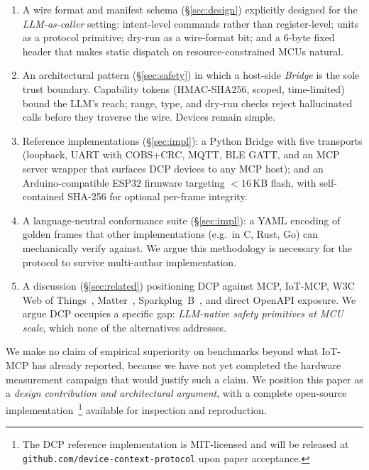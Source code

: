 \documentclass[11pt,a4paper]{article}
\begin{document}
\begin{enumerate}[leftmargin=*,nosep]
  \item A wire format and manifest schema (\S\ref{sec:design}) explicitly
        designed for the \emph{LLM-as-caller} setting: intent-level commands
        rather than register-level; units as a protocol primitive; dry-run as
        a wire-format bit; and a 6-byte fixed header that makes static
        dispatch on resource-constrained MCUs natural.
  \item An architectural pattern (\S\ref{sec:safety}) in which a host-side
        \emph{Bridge} is the sole trust boundary. Capability tokens
        (HMAC-SHA256, scoped, time-limited) bound the LLM's reach; range,
        type, and dry-run checks reject hallucinated calls before they
        traverse the wire. Devices remain simple.
  \item Reference implementations (\S\ref{sec:impl}): a Python Bridge with
        five transports (loopback, UART with COBS+CRC, MQTT, BLE GATT, and
        an MCP server wrapper that surfaces DCP devices to any MCP host);
        and an Arduino-compatible ESP32 firmware targeting $<\!16$\,KB
        flash, with self-contained SHA-256 for optional per-frame integrity.
  \item A language-neutral conformance suite (\S\ref{sec:impl}): a YAML
        encoding of golden frames that other implementations
        (e.g.\ in C, Rust, Go) can mechanically verify against. We argue
        this methodology is necessary for the protocol to survive
        multi-author implementation.
  \item A discussion (\S\ref{sec:related}) positioning DCP against MCP,
        IoT-MCP, W3C Web of Things~\cite{wot_td_2025},
        Matter~\cite{matter_spec}, Sparkplug~B~\cite{sparkplug}, and direct
        OpenAPI exposure. We argue DCP occupies a specific gap: \emph{LLM-native
        safety primitives at MCU scale}, which none of the alternatives
        addresses.
\end{enumerate}

We make no claim of empirical superiority on benchmarks beyond what
IoT-MCP has already reported, because we have not yet completed the
hardware measurement campaign that would justify such a claim. We position
this paper as a \emph{design contribution and architectural argument},
with a complete open-source implementation~\cite{wot_td_2025}\footnote{
The DCP reference implementation is MIT-licensed and will be released at
\texttt{github.com/device-context-protocol} upon paper acceptance.}
available for inspection and reproduction.
\end{document}
